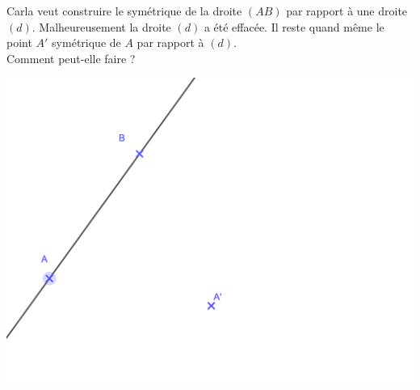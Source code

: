 \documentclass[12pt,a4paper]{article}
\date{}
\title{}
\begin{document}





\begin{myact}
	\noindent Carla veut construire le symétrique de la droite $(AB)$ par rapport à une droite $(d)$. 
	Malheureusement la droite $(d)$ a été effacée. Il reste quand même le point $A'$ symétrique de $A$ par rapport à $(d)$.\\
	
	\noindent Comment peut-elle faire ?
	
	\begin{center}
		\includegraphics[scale=0.22]{act1}
	\end{center}
\end{myact}



\newpage

%
%
%
%
\end{document}
